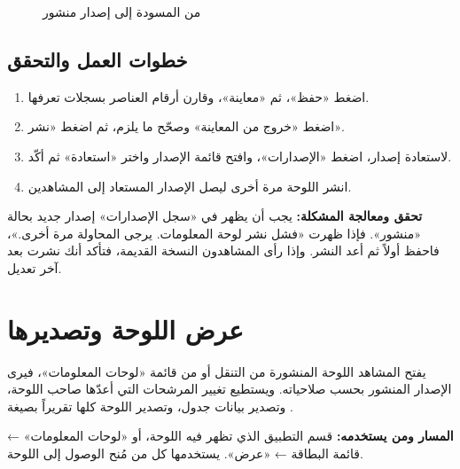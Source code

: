 \begin{figure}[H]
\centering
{}
\rclegend
\caption{من المسودة إلى إصدار منشور}
\label{fig:builder-dashboards-publish-flow}
\end{figure}

\subsection{خطوات العمل والتحقق}
\begin{enumerate}
\item اضغط «حفظ»، ثم «معاينة»، وقارن أرقام العناصر بسجلات تعرفها.
\item اضغط «خروج من المعاينة» وصحّح ما يلزم، ثم اضغط «نشر».
\item لاستعادة إصدار، اضغط «الإصدارات»، وافتح قائمة الإصدار واختر «استعادة» ثم أكّد.
\item انشر اللوحة مرة أخرى ليصل الإصدار المستعاد إلى المشاهدين.
\end{enumerate}

\textbf{تحقق ومعالجة المشكلة:} يجب أن يظهر في «سجل الإصدارات» إصدار جديد بحالة «منشور». فإذا ظهرت «فشل نشر لوحة المعلومات. يرجى المحاولة مرة أخرى.»، فاحفظ أولاً ثم أعد النشر. وإذا رأى المشاهدون النسخة القديمة، فتأكد أنك نشرت بعد آخر تعديل.

\clearpage
\section{عرض اللوحة وتصديرها}
\label{sec:builder-feature-dashboards-viewing}

يفتح المشاهد اللوحة المنشورة من التنقل أو من قائمة «لوحات المعلومات»، فيرى الإصدار المنشور بحسب صلاحياته. ويستطيع تغيير المرشحات التي أعدّها صاحب اللوحة، وتصدير بيانات جدول، وتصدير اللوحة كلها تقريراً بصيغة .

\textbf{المسار ومن يستخدمه:} قسم التطبيق الذي تظهر فيه اللوحة، أو «لوحات المعلومات» ← قائمة البطاقة ← «عرض». يستخدمها كل من مُنح الوصول إلى اللوحة.

